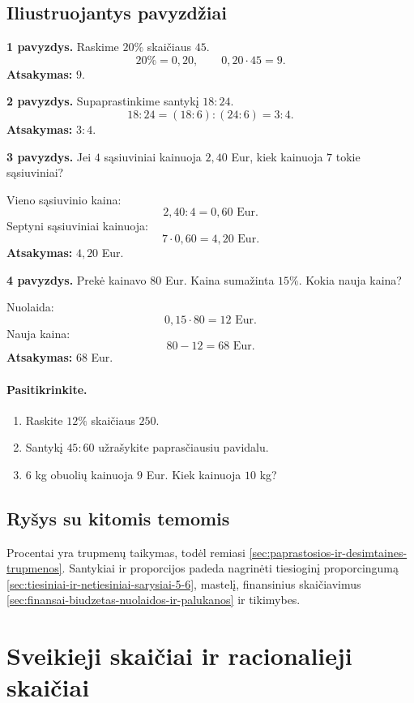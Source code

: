 \subsection{Iliustruojantys pavyzdžiai}
\textbf{1 pavyzdys.} Raskime \(20\%\) skaičiaus \(45\).
\[
20\%=0,20,\qquad 0,20\cdot 45=9.
\]
\textbf{Atsakymas:} \(9\).

\textbf{2 pavyzdys.} Supaprastinkime santykį \(18:24\).
\[
18:24=(18:6):(24:6)=3:4.
\]
\textbf{Atsakymas:} \(3:4\).

\textbf{3 pavyzdys.} Jei \(4\) sąsiuviniai kainuoja \(2,40\) Eur, kiek kainuoja \(7\) tokie sąsiuviniai?

Vieno sąsiuvinio kaina:
\[
2,40:4=0,60\text{ Eur}.
\]
Septyni sąsiuviniai kainuoja:
\[
7\cdot 0,60=4,20\text{ Eur}.
\]
\textbf{Atsakymas:} \(4,20\) Eur.

\textbf{4 pavyzdys.} Prekė kainavo \(80\) Eur. Kaina sumažinta \(15\%\). Kokia nauja kaina?

Nuolaida:
\[
0,15\cdot 80=12\text{ Eur}.
\]
Nauja kaina:
\[
80-12=68\text{ Eur}.
\]
\textbf{Atsakymas:} \(68\) Eur.

\paragraph{Pasitikrinkite.}
\begin{enumerate}[label=\arabic*.]
\item Raskite \(12\%\) skaičiaus \(250\).
\item Santykį \(45:60\) užrašykite paprasčiausiu pavidalu.
\item \(6\) kg obuolių kainuoja \(9\) Eur. Kiek kainuoja \(10\) kg?
\end{enumerate}

\subsection{Ryšys su kitomis temomis}
Procentai yra trupmenų taikymas, todėl remiasi \ref{sec:paprastosios-ir-desimtaines-trupmenos}. Santykiai ir proporcijos padeda nagrinėti tiesioginį proporcingumą \ref{sec:tiesiniai-ir-netiesiniai-sarysiai-5-6}, mastelį, finansinius skaičiavimus \ref{sec:finansai-biudzetas-nuolaidos-ir-palukanos} ir tikimybes.

\section{Sveikieji skaičiai ir racionalieji skaičiai}\label{sec:sveikieji-skaiciai-ir-racionalieji-skaiciai}

